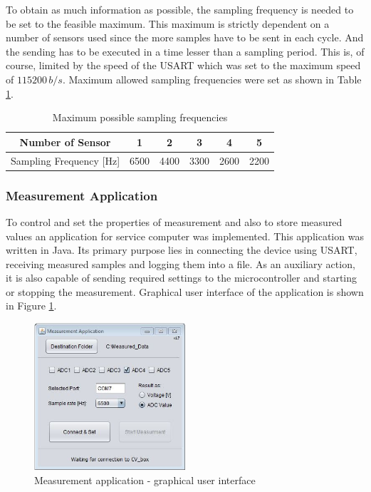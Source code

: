 \documentclass[twoside]{ctuthesis}
\theoremstyle{plain}
\theoremstyle{definition}
\theoremstyle{note}
\begin{document}
To obtain as much information as possible, the sampling frequency is needed to be set to the feasible maximum. This maximum is strictly dependent on a number of sensors used since the more samples have to be sent in each cycle. And the sending has to be executed in a time lesser than a sampling period. This is, of course, limited by the speed of the USART which was set to the maximum speed of $115200\,b/s$. Maximum allowed sampling frequencies were set as shown in Table \ref{tab:possibleFs}.
\begin{table}[htbp]
	\centering
	\caption{Maximum possible sampling frequencies}
	\begin{tabular}{cccccc}
		\toprule
		Number of Sensor     & 1 & 2 & 3 & 4 & 5 \\
		\midrule
		Sampling Frequency [Hz]  & 6500  & 4400   & 3300 & 2600   & 2200  \\
		
		\bottomrule
	\end{tabular}%
	\label{tab:possibleFs}%
\end{table}%

\subsubsection{Measurement Application}
To control and set the properties of measurement and also to store measured values an application for service computer was implemented. This application was written in Java. Its primary purpose lies in connecting the device using USART, receiving measured samples and logging them into a file. As an auxiliary action, it is also capable of sending required settings to the microcontroller and starting or stopping the measurement. Graphical user interface of the application is shown in Figure \ref{fig:gui_APP}.
\begin{figure}[h]
	\centering
	\includegraphics[width=0.5\textwidth]{Measurement_app.JPG}
	\caption{Measurement application - graphical user interface}
	\label{fig:gui_APP}
\end{figure}
\end{document}

